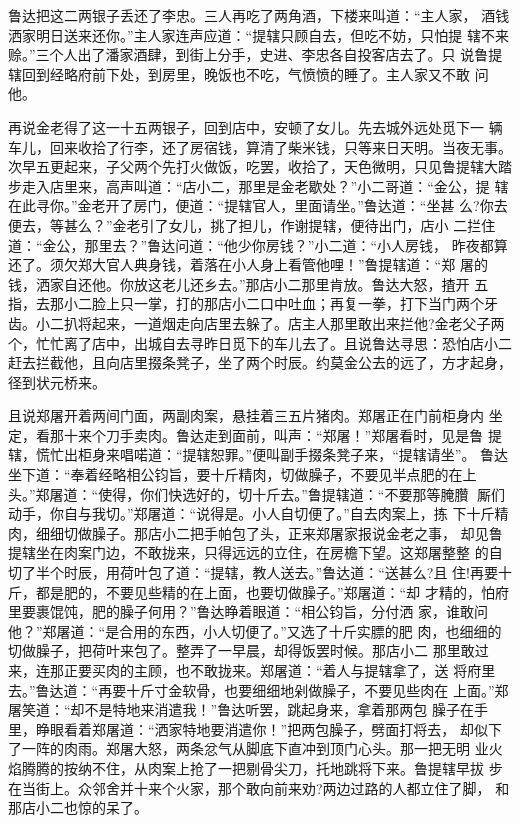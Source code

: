 鲁达把这二两银子丢还了李忠。三人再吃了两角酒，下楼来叫道：“主人家，
酒钱洒家明日送来还你。”主人家连声应道：“提辖只顾自去，但吃不妨，只怕提
辖不来赊。”三个人出了潘家酒肆，到街上分手，史进、李忠各自投客店去了。只
说鲁提辖回到经略府前下处，到房里，晚饭也不吃，气愤愤的睡了。主人家又不敢
问他。

再说金老得了这一十五两银子，回到店中，安顿了女儿。先去城外远处觅下一
辆车儿，回来收拾了行李，还了房宿钱，算清了柴米钱，只等来日天明。当夜无事。
次早五更起来，子父两个先打火做饭，吃罢，收拾了，天色微明，只见鲁提辖大踏
步走入店里来，高声叫道：“店小二，那里是金老歇处？”小二哥道：“金公，提
辖在此寻你。”金老开了房门，便道：“提辖官人，里面请坐。”鲁达道：“坐甚
么?你去便去，等甚么？”金老引了女儿，挑了担儿，作谢提辖，便待出门，店小
二拦住道：“金公，那里去？”鲁达问道：“他少你房钱？”小二道：“小人房钱，
昨夜都算还了。须欠郑大官人典身钱，着落在小人身上看管他哩！”鲁提辖道：“郑
屠的钱，洒家自还他。你放这老儿还乡去。”那店小二那里肯放。鲁达大怒，揸开
五指，去那小二脸上只一掌，打的那店小二口中吐血；再复一拳，打下当门两个牙
齿。小二扒将起来，一道烟走向店里去躲了。店主人那里敢出来拦他?金老父子两
个，忙忙离了店中，出城自去寻昨日觅下的车儿去了。且说鲁达寻思：恐怕店小二
赶去拦截他，且向店里掇条凳子，坐了两个时辰。约莫金公去的远了，方才起身，
径到状元桥来。

且说郑屠开着两间门面，两副肉案，悬挂着三五片猪肉。郑屠正在门前柜身内
坐定，看那十来个刀手卖肉。鲁达走到面前，叫声：“郑屠！”郑屠看时，见是鲁
提辖，慌忙出柜身来唱喏道：“提辖恕罪。”便叫副手掇条凳子来，“提辖请坐”。
鲁达坐下道：“奉着经略相公钧旨，要十斤精肉，切做臊子，不要见半点肥的在上
头。”郑屠道：“使得，你们快选好的，切十斤去。”鲁提辖道：“不要那等腌臢
厮们动手，你自与我切。”郑屠道：“说得是。小人自切便了。”自去肉案上，拣
下十斤精肉，细细切做臊子。那店小二把手帕包了头，正来郑屠家报说金老之事，
却见鲁提辖坐在肉案门边，不敢拢来，只得远远的立住，在房檐下望。这郑屠整整
的自切了半个时辰，用荷叶包了道：“提辖，教人送去。”鲁达道：“送甚么?且
住!再要十斤，都是肥的，不要见些精的在上面，也要切做臊子。”郑屠道：“却
才精的，怕府里要裹馄饨，肥的臊子何用？”鲁达睁着眼道：“相公钧旨，分付洒
家，谁敢问他？”郑屠道：“是合用的东西，小人切便了。”又选了十斤实膘的肥
肉，也细细的切做臊子，把荷叶来包了。整弄了一早晨，却得饭罢时候。那店小二
那里敢过来，连那正要买肉的主顾，也不敢拢来。郑屠道：“着人与提辖拿了，送
将府里去。”鲁达道：“再要十斤寸金软骨，也要细细地剁做臊子，不要见些肉在
上面。”郑屠笑道：“却不是特地来消遣我！”鲁达听罢，跳起身来，拿着那两包
臊子在手里，睁眼看着郑屠道：“洒家特地要消遣你！”把两包臊子，劈面打将去，
却似下了一阵的肉雨。郑屠大怒，两条忿气从脚底下直冲到顶门心头。那一把无明
业火焰腾腾的按纳不住，从肉案上抢了一把剔骨尖刀，托地跳将下来。鲁提辖早拔
步在当街上。众邻舍并十来个火家，那个敢向前来劝?两边过路的人都立住了脚，
和那店小二也惊的呆了。

